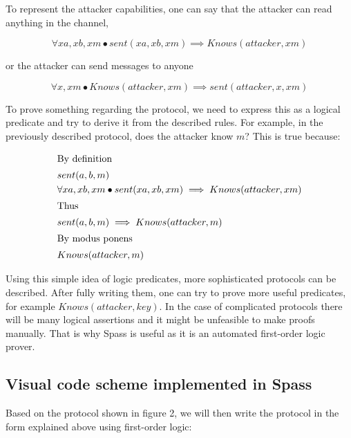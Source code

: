\documentclass{article}
\begin{document}
	To represent the attacker capabilities, one can say that the attacker can read anything in the channel,
	
	$$ \forall xa, xb, xm \bullet  sent(xa,xb,xm) \implies Knows(attacker, xm) $$

	or the attacker can send messages to anyone
	
	$$ \forall x, xm \bullet  Knows(attacker, xm) \implies sent(attacker, x, xm) $$

	To prove something regarding the protocol, we need to express this as a logical predicate and try to derive it from
	the described rules. For example, in the previously described protocol, does the attacker know $m$? This is true
	because:
		
	\begin{align*}
	\shortintertext{By definition}
	&sent(a,b,m)\\
	&\forall xa, xb, xm \bullet  sent(xa,xb,xm) \implies Knows(attacker, xm)\\
	\shortintertext{Thus}
	&sent(a,b,m) \implies Knows(attacker, m)\\
	\shortintertext{By modus ponens}
	&Knows(attacker, m)\\
	\end{align*}

	Using this simple idea of logic predicates, more sophisticated protocols can be described. After fully writing them,
	one can try to prove more useful predicates, for example $Knows(attacker, key)$. In the case of complicated protocols
	there will be many logical assertions and it might be unfeasible to make proofs manually. That is why Spass is useful as it
	is an automated first-order logic prover.

\subsection{Visual code scheme implemented in Spass}
	Based on the protocol shown in figure 2, we will then write the protocol in the form explained above using first-order logic:
	
\end{document}
